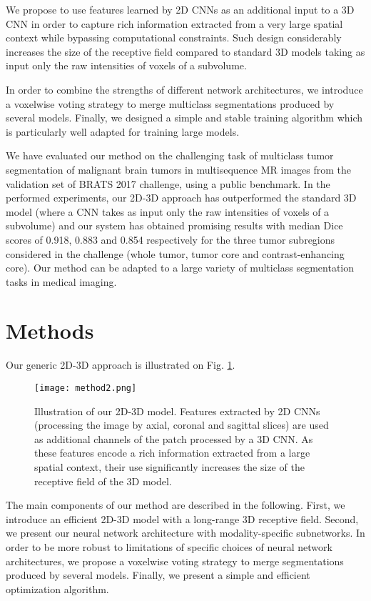 \documentclass[preprint,12pt]{elsarticle}
\begin{document}
We propose to use features learned by 2D CNNs as an additional input to a 3D CNN in order to capture rich information extracted from a very large spatial context while bypassing computational constraints. Such design considerably increases the size of the receptive field compared to standard 3D models taking as input only the raw intensities of voxels of a subvolume.

In order to combine the strengths of different network architectures, we introduce a voxelwise voting strategy to merge multiclass segmentations produced by several models. Finally, we designed a simple and stable training algorithm which is particularly well adapted for training large models. 

We have evaluated our method on the challenging task of multiclass tumor segmentation of malignant brain tumors in multisequence MR images from the validation set of BRATS 2017 challenge, using a public benchmark. In the performed experiments, our 2D-3D approach has outperformed the standard 3D model (where a CNN takes as input only the raw intensities of voxels of a subvolume) and our system has obtained promising results with median Dice scores of 0.918, 0.883 and 0.854 respectively for the three tumor subregions considered in the challenge (whole tumor, tumor core and contrast-enhancing core). Our method can be adapted to a large variety of multiclass segmentation tasks in medical imaging.




\section{Methods}
Our generic 2D-3D approach is illustrated on Fig. \ref{fig_method}.
\begin{figure}[h!]
\centering
\texttt{[image: method2.png]}
\caption{Illustration of our 2D-3D model. Features extracted by 2D CNNs (processing the image by axial, coronal and sagittal slices) are used as additional channels of the patch processed by a 3D CNN. As these features encode a rich information extracted from a large spatial context, their use significantly increases the size of the receptive field of the 3D model.}
\label{fig_method}
\end{figure}




The main components of our method are described in the following. First, we introduce an efficient 2D-3D model with a long-range 3D receptive field. Second, we present our neural network architecture with modality-specific subnetworks. In order to be more robust to limitations of specific choices of neural network architectures, we propose a voxelwise voting strategy to merge segmentations produced by several models.  Finally, we present a simple and efficient optimization algorithm.
\end{document}
